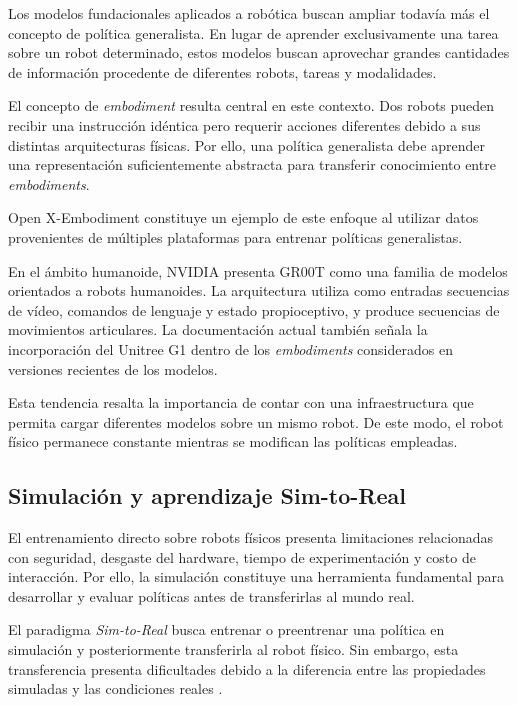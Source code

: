 \documentclass[stu,12pt,floatsintext]{apa7}
\begin{document}
Los modelos fundacionales aplicados a robótica buscan ampliar todavía más el concepto de política generalista. En lugar de aprender exclusivamente una tarea sobre un robot determinado, estos modelos buscan aprovechar grandes cantidades de información procedente de diferentes robots, tareas y modalidades.

El concepto de \textit{embodiment} resulta central en este contexto. Dos robots pueden recibir una instrucción idéntica pero requerir acciones diferentes debido a sus distintas arquitecturas físicas. Por ello, una política generalista debe aprender una representación suficientemente abstracta para transferir conocimiento entre \textit{embodiments}.

Open X-Embodiment constituye un ejemplo de este enfoque al utilizar datos provenientes de múltiples plataformas para entrenar políticas generalistas.

En el ámbito humanoide, NVIDIA presenta GR00T como una familia de modelos orientados a robots humanoides. La arquitectura utiliza como entradas secuencias de vídeo, comandos de lenguaje y estado propioceptivo, y produce secuencias de movimientos articulares. La documentación actual también señala la incorporación del Unitree G1 dentro de los \textit{embodiments} considerados en versiones recientes de los modelos.

Esta tendencia resalta la importancia de contar con una infraestructura que permita cargar diferentes modelos sobre un mismo robot. De este modo, el robot físico permanece constante mientras se modifican las políticas empleadas.

\subsection{Simulación y aprendizaje Sim-to-Real}

El entrenamiento directo sobre robots físicos presenta limitaciones relacionadas con seguridad, desgaste del hardware, tiempo de experimentación y costo de interacción. Por ello, la simulación constituye una herramienta fundamental para desarrollar y evaluar políticas antes de transferirlas al mundo real.

El paradigma \textit{Sim-to-Real} busca entrenar o preentrenar una política en simulación y posteriormente transferirla al robot físico. Sin embargo, esta transferencia presenta dificultades debido a la diferencia entre las propiedades simuladas y las condiciones reales \parencite{ghasemi2024introductionreinforcementlearning}.
\end{document}
